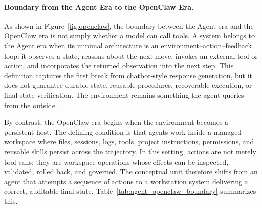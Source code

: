 \paragraph{Boundary from the Agent Era to the OpenClaw Era.}
As shown in Figure~\ref{fig:openclaw}, the boundary between the Agent era and the OpenClaw era is not simply whether a model can call tools.
A system belongs to the Agent era when its minimal architecture is an environment--action--feedback loop: it observes a state, reasons about the next move, invokes an external tool or action, and incorporates the returned observation into the next step.
This definition captures the first break from chatbot-style response generation, but it does not guarantee durable state, reusable procedures, recoverable execution, or final-state verification.
The environment remains something the agent queries from the outside.

By contrast, the OpenClaw era begins when the environment becomes a persistent host.
The defining condition is that agents work inside a managed workspace where files, sessions, logs, tools, project instructions, permissions, and reusable skills persist across the trajectory.
In this setting, actions are not merely tool calls; they are workspace operations whose effects can be inspected, validated, rolled back, and governed.
The conceptual unit therefore shifts from an agent that attempts a sequence of actions to a workstation system delivering a correct, auditable final state.
Table~\ref{tab:agent_openclaw_boundary} summarizes this.

